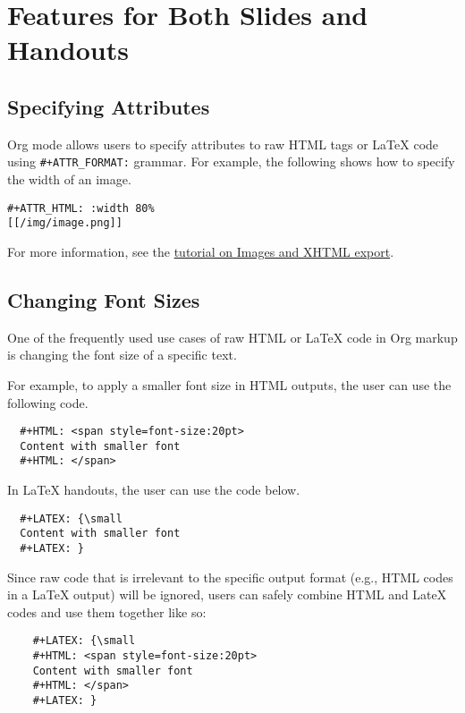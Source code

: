\documentclass[10pt,article]{article}
\begin{document}
\section{Features for Both Slides and Handouts}
\label{sec:org3b490c1}
\subsection{Specifying Attributes}
\label{sec:org0af6cac}
Org mode allows users to specify attributes to raw HTML tags or \LaTeX{} code
using \texttt{\#+ATTR\_FORMAT:} grammar. For example, the following shows how to 
specify the width of an image.

\begin{verbatim}
#+ATTR_HTML: :width 80%
[[/img/image.png]]
\end{verbatim}

For more information, see the \href{https://orgmode.org/worg/org-tutorials/images-and-xhtml-export.html}{tutorial on Images and XHTML export}.

\subsection{Changing Font Sizes}
\label{sec:org72b2ec1}
One of the frequently used use cases of raw HTML or \LaTeX{} code in Org markup
is changing the font size of a specific text. 

For example, to apply a smaller
font size in HTML outputs, the user can use the following code.

\begin{verbatim}
  #+HTML: <span style=font-size:20pt>
  Content with smaller font
  #+HTML: </span>
\end{verbatim}

In \LaTeX{} handouts, the user can use the code below.

\begin{verbatim}
  #+LATEX: {\small
  Content with smaller font
  #+LATEX: }
\end{verbatim}

Since raw code that is irrelevant to the specific output format (e.g.,
HTML codes in a \LaTeX{} output) will be ignored, users can safely combine 
HTML and LateX codes and use them together like so:

\begin{verbatim}
    #+LATEX: {\small
    #+HTML: <span style=font-size:20pt>
    Content with smaller font
    #+HTML: </span>
    #+LATEX: }
\end{verbatim}
\end{document}
